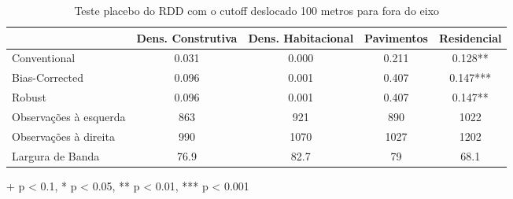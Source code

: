 \begin{table}[h]
\caption{Teste placebo do RDD com o cutoff deslocado 100 metros para fora do eixo} 
\fontsize{10.0pt}{12.pt}\selectfont
\centering
\begin{tabular*}{.9\linewidth}{@{\extracolsep{\fill}}lcccc}
\toprule
  & Dens. Construtiva & Dens. Habitacional & Pavimentos & Residencial \\ 
\midrule\addlinespace[2.5pt]
Conventional & 0.031 & 0.000 & 0.211 & 0.128** \\ 
Bias-Corrected & 0.096 & 0.001 & 0.407 & 0.147*** \\ 
{Robust} & {0.096} & {0.001} & {0.407} & {0.147**} \\
\midrule 
Observações à esquerda & 863 & 921 & 890 & 1022 \\ 
Observações à direita & 990 & 1070 & 1027 & 1202 \\ 
Largura de Banda & 76.9 & 82.7 & 79 & 68.1 \\ 
\bottomrule
\end{tabular*}
\label{tab:analise/rdd-reg-IPTU-posPDE}

\begin{minipage}{.9\linewidth}
+ p < 0.1, * p < 0.05, ** p < 0.01, *** p < 0.001\\
\end{minipage}
\end{table}

